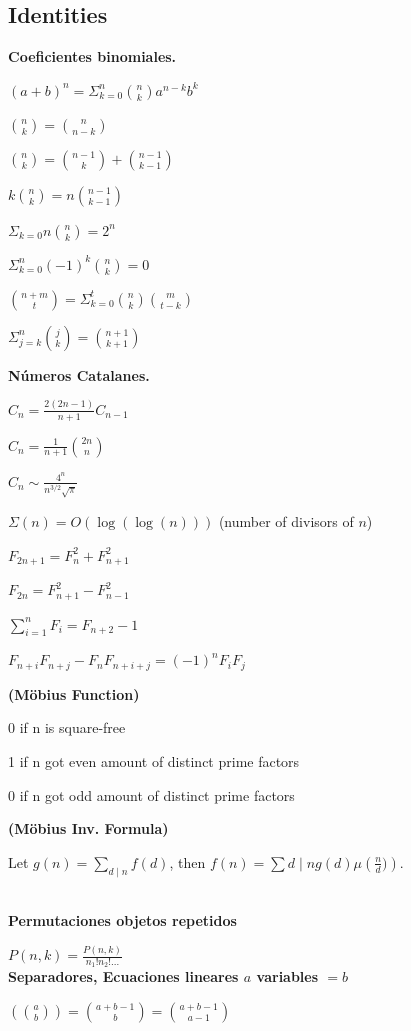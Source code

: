 \subsection{Identities}
{

\textbf{Coeficientes binomiales.}

$(a+b)^{n} = \Sigma_{k = 0}^{n} \binom{n}{k}a^{n-k}b^{k}$

$\binom{n}{k} = \binom{n}{n-k}$

$\binom{n}{k} = \binom{n-1}{k} + \binom{n-1}{k-1}$

$k\binom{n}{k} = n\binom{n-1}{k-1}$

$\Sigma_{k = 0}{n}\binom{n}{k} = 2^{n}$

$\Sigma_{k = 0}^{n} (-1)^{k}\binom{n}{k} = 0$

$\binom{n+m}{t} = \Sigma_{k = 0}^{t}\binom{n}{k}\binom{m}{t-k}$

$\Sigma_{j = k}^{n} \binom{j}{k} = \binom{n+1}{k+1}$

\textbf{Números Catalanes.}

$C_n = \frac{2(2n-1)}{n+1} C_{n-1}$

$C_n = \frac{1}{n+1} \binom{2n}{n}$

$C_n \sim \frac{4^n}{n^{3/2}\sqrt{\pi}}$

$\Sigma(n) = O(\log(\log(n)))$ (number of divisors of $n$)

$F_{2n+1} = F_{n}^2 + F_{n+1}^2$

$F_{2n} = F_{n+1}^2 - F_{n-1}^2$

$\sum_{i=1}^n F_i = F_{n+2}-1$

$F_{n+i}F_{n+j} - F_nF_{n+i+j} = (-1)^n F_iF_j$

\textbf{(Möbius Function)}

0 if n is square-free

1 if n got even amount of distinct prime factors

0 if n got odd amount of distinct prime factors

\textbf{(Möbius Inv. Formula)}

Let $g(n) = \sum_{d\mid n} f(d)$, then $f(n)=\sum{d\mid n} g(d) \mu\left(\frac{n}{d})\right)$.
}
\\
\textbf{Permutaciones objetos repetidos}

$P(n,k) = \frac{P(n,k)}{n_{1}!n_{2}!...}$ 
\\
\textbf{Separadores, Ecuaciones lineares $a$ variables $= b$}
  
$\left(\binom{a}{b}\right) = \binom{a+b-1}{b} = \binom{a+b-1}{a-1}$

